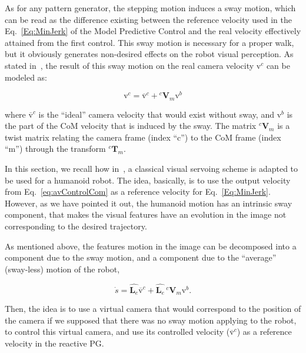 As for any pattern generator, the stepping motion induces a sway motion, which can be read as the difference existing between the reference velocity used in the Eq.~\ref{Eq:MinJerk} of the Model Predictive Control and the real velocity effectively attained from the first control. This sway motion is necessary for a proper walk, but it obviously generates non-desired effects on the robot visual perception. As stated in~\citep{DuneIROS2010}, the result of this sway motion on the real camera velocity $\text{v}^c$ can be modeled as:

\begin{equation}
\text{v}^c =\overline{\text{v}}^c+{^{c} \mathbf V_{m}} \text{v}^b
\label{eq:sway}
\end{equation}

where $\overline{\text{v}}^c$ is the ``ideal'' camera velocity that would exist without sway, and $\text{v}^b$ is the part of the CoM velocity that is induced by the sway. The matrix ${^c \mathbf V_{m}}$ is a twist matrix relating the camera frame (index ``c'') to the CoM frame (index ``m'') through the transform ${^c \mathbf T_{m}}$.

In this section, we recall how in~\citep{DuneIROS2010}, a classical visual servoing scheme is adapted to be used for a humanoid robot. The idea, basically, is to use the output velocity from Eq.~\ref{eq:avControlCom} as a reference velocity for Eq.~\ref{Eq:MinJerk}. However, as we have pointed it out, the humanoid motion has an intrinsic sway component, that makes the visual features have an evolution in the image not corresponding to the desired trajectory. 

As mentioned above, the features motion in the image can be decomposed into a component due to the sway motion, and a component due to the ``average'' (sway-less) motion of the robot,

\begin{equation}
\dot{s}={\widehat{\mathbf L_e}} \overline{\text{v}}^c+ {\widehat{\mathbf L_e}} \, ^c \mathbf V_{m}{\text{v}^{b}}.
\end{equation}

Then, the idea is to use a virtual camera that would correspond to the position of the camera if we supposed that there was no sway motion applying to the robot, to control this virtual camera, and use its controlled velocity ($\overline{\text{v}}^c$) as a reference velocity in the reactive PG.
 

